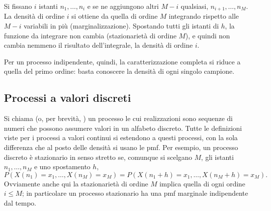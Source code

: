 

\begin{dimostrazione}
\passo{} Si fissano $i$ istanti $n_1, \ldots, n_i$ e se ne aggiungono altri $M - i$ qualsiasi, $n_{i+1}, \ldots, n_M$. La
densità di ordine $i$ si ottiene da quella di ordine $M$ integrando rispetto alle $M - i$ variabili in più
(marginalizzazione). Spostando tutti gli istanti di $h$, la funzione da integrare non cambia (stazionarietà di ordine
$M$), e quindi non cambia nemmeno il risultato dell'integrale, la densità di ordine $i$.
\end{dimostrazione}


Per un processo indipendente, quindi, la caratterizzazione completa si riduce a quella del primo ordine: basta
conoscere la densità di ogni singolo campione.

\subsection{Processi a valori discreti}

Si chiama  (o, per brevità, ) un processo le cui realizzazioni
sono sequenze di numeri che possono assumere valori in un alfabeto discreto. Tutte le definizioni viste per i processi a
valori continui si estendono a questi processi, con la sola differenza che al posto delle densità si usano le pmf. Per
esempio, un processo discreto è stazionario in senso stretto se, comunque si scelgano $M$, gli istanti
$n_1, \ldots, n_M$ e uno spostamento $h$,
\[ P(X(n_1) = x_1, \ldots, X(n_M) = x_M) = P(X(n_1 + h) = x_1, \ldots, X(n_M + h) = x_M) . \]
Ovviamente anche qui la stazionarietà di ordine $M$ implica quella di ogni ordine $i \leq M$; in particolare un processo
stazionario ha una pmf marginale indipendente dal tempo.

